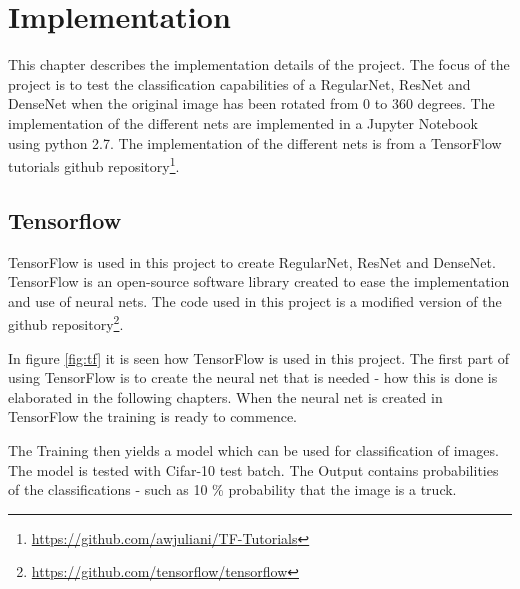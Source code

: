 \chapter{Implementation}
\label{chp:impl}

This chapter describes the implementation details of the project. The focus of the project is to test the classification capabilities of a RegularNet, ResNet and DenseNet when the original image has been rotated from 0 to 360 degrees. The implementation of the different nets are implemented in a Jupyter Notebook using python 2.7. The implementation of the different nets is from a TensorFlow tutorials github repository\footnote{\url{https://github.com/awjuliani/TF-Tutorials}}.

\section{Tensorflow}
TensorFlow is used in this project to create RegularNet, ResNet and DenseNet. 
TensorFlow is an open-source software library created to ease the implementation and use of neural nets. The code used in this project is a modified version of the github repository\footnote{\url{https://github.com/tensorflow/tensorflow}}.

In figure \ref{fig:tf} it is seen how TensorFlow is used in this project. The first part of using TensorFlow is to create the neural net that is needed - how this is done is elaborated in the following chapters. When the neural net is created in TensorFlow the training is ready to commence. 

The Training then yields a model which can be used for classification of images. The model is tested with Cifar-10 test batch. The Output contains probabilities of the classifications - such as 10 \% probability that the image is a truck.



\newpage

\newpage



